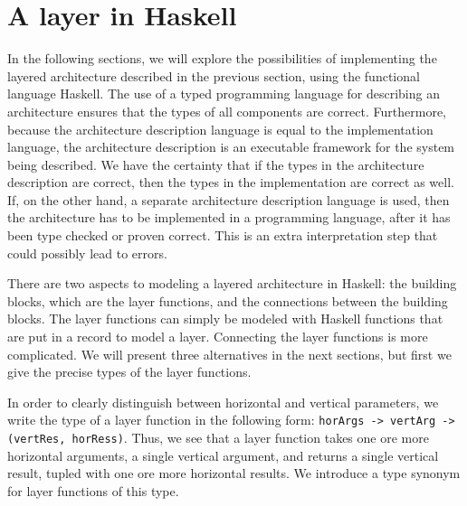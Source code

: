 %																
%																
%																
\section{A layer in Haskell}

In the following sections, we will explore the possibilities of implementing the layered architecture described in the previous section, using the functional language Haskell. The use of a typed programming language for describing an architecture ensures that the types of all components are correct. Furthermore, because the architecture description language is equal to the implementation language, the architecture description is an executable framework for the system being described. We have the certainty that if the types in the architecture description are correct, then the types in the implementation are correct as well. If, on the other hand, a separate architecture description language is used, then the architecture has to be implemented in a programming language, after it has been type checked or proven correct. This is an extra interpretation step that could possibly lead to errors.

There are two aspects to modeling a layered architecture in Haskell: the building blocks, which are the layer functions, and the connections between the building blocks. The layer functions can simply be modeled with Haskell functions that are put in a record to model a layer. Connecting the layer functions is more complicated. We will present three alternatives in the next sections, but first we give the precise types of the layer functions. 

In order to clearly distinguish between horizontal and vertical parameters, we write the type of a layer function in the following form: \texttt{horArgs -> vertArg -> (vertRes, horRess)}. Thus, we see that a layer function takes one ore more horizontal arguments, a single vertical argument, and returns a single vertical result, tupled with one ore more horizontal results. We introduce a type synonym for layer functions of this type. 


